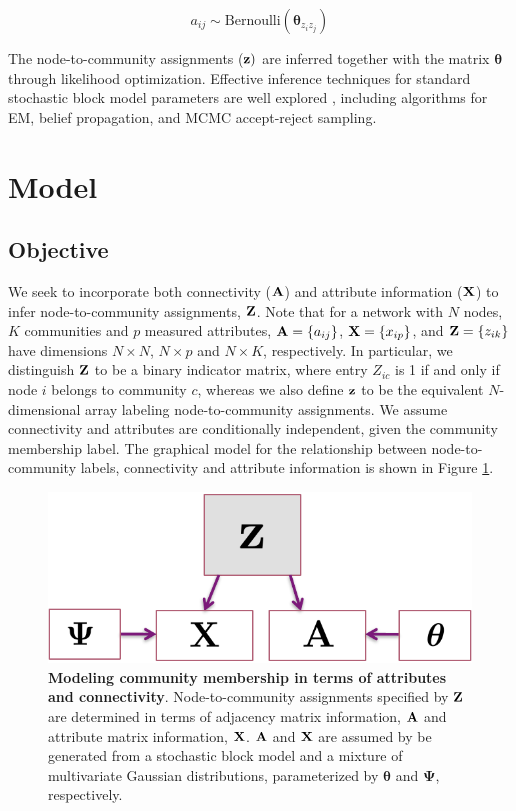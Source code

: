 \begin{equation}
a_{ij} \sim \text{Bernoulli}(\boldsymbol \theta_{z_{i}z_{j}})
\end{equation}

The node-to-community assignments (${\bf z})$ are inferred together with the matrix ${\boldsymbol \theta}$ through likelihood optimization. Effective inference techniques for standard stochastic block model parameters are well explored \cite{comparative,tiagomcmc,dudin}, including algorithms for EM, belief propagation, and MCMC accept-reject sampling. 

\section{Model}
\subsection{Objective}
We seek to incorporate both connectivity (${\bf A}$) and attribute information (${\bf X}$) to infer node-to-community assignments, ${\bf Z}$. Note that for a network with $N$ nodes, $K$ communities and $p$ measured attributes, ${\bf A}=\{a_{ij}\}$, ${\bf X}=\{x_{ip}\}$, and ${\bf Z}=
\{z_{ik}\}$ have dimensions $N \times N$, $N \times p$ and $N \times K$, respectively. In particular, we distinguish ${\bf Z}$ to be a binary indicator matrix, where entry $Z_{ic}$ is 1 if and only if node $i$ belongs to community $c$, whereas we also define ${\bf z}$ to be the equivalent $N$-dimensional array labeling node-to-community assignments. We assume connectivity and attributes are conditionally independent, given the community membership label. The graphical model for the relationship between node-to-community labels, connectivity and attribute information is shown in Figure \ref{fig:graphical_model}.

\begin{figure}
\begin{center}
\includegraphics[scale=1]{GraphModel.pdf}
\caption{{\bf Modeling community membership in terms of attributes and connectivity}. Node-to-community assignments specified by ${\bf Z}$ are determined in terms of adjacency matrix information, ${\bf A}$ and attribute matrix information, ${\bf X}$. ${\bf A}$ and ${\bf X}$ are assumed by be generated from a stochastic block model and a mixture of multivariate Gaussian distributions, parameterized by ${\boldsymbol \theta}$ and ${\boldsymbol \Psi}$, respectively.
\label{fig:graphical_model}} 
\end{center}
\end{figure}

